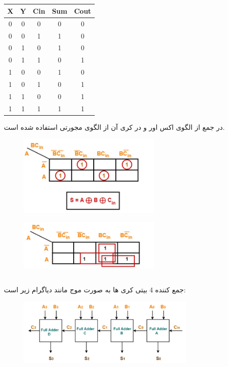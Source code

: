 \documentclass[20pt, a4paper]{article}
\begin{document}
\newpage
\subsection{}

\begin{LTR}
	\begin{tabular}{ c c c | c | c }
		X & Y & Cin & Sum & Cout \\
		\hline
		0 & 0 & 0 &  0 &  0\\ 				
		0 & 0 & 1 &  1 &  0\\
		0 & 1 & 0 &  1 &  0\\
		0 & 1 & 1 &  0 &  1\\
		1 & 0 & 0 &  1 &  0\\
		1 & 0 & 1 &  0 &  1\\
		1 & 1 & 0 &  0 &  1\\
		1 & 1 & 1 &  1 &  1\\	
	\end{tabular}
\end{LTR}
\hfill \break

در جمع
از الگوی اکس اور و در کری آن از الگوی مجورتی استفاده شده است.
\begin{figure}[htbp]\centering
	\centerline{\includegraphics[width=200pt]{img/lastest/fullAdderXor.jpg}}
\end{figure}

\begin{figure}[htbp]\centering
	\centerline{\includegraphics[width=200pt]{img/lastest/fullAdderMajority.jpg}}
\end{figure}
\newpage




\subsection{}
جمع کننده 4 بیتی کری ها به صورت موج مانند دیاگرام زیر است:
\begin{figure}[htbp]\centering
	\centerline{\includegraphics[width=250pt]{img/lastest/4bitRippleCarryAdder.jpg}}
\end{figure}
\end{document}
